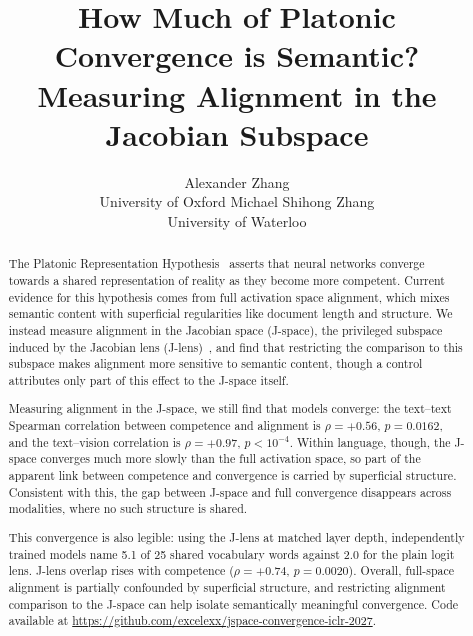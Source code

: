 \documentclass{article}
\title{How Much of Platonic Convergence is Semantic? Measuring Alignment in the Jacobian Subspace}
\author{%
  Alexander Zhang \\
  University of Oxford
  \And
  Michael Shihong Zhang \\
  University of Waterloo
}
\begin{document}
\raggedbottom

\maketitle

\begin{abstract}
  The Platonic Representation Hypothesis~\citep{huh2024platonic} asserts that neural networks converge towards a shared representation of reality as they become more competent. Current evidence for this hypothesis comes from full activation space alignment, which mixes semantic content with superficial regularities like document length and structure. We instead measure alignment in the Jacobian space (J-space), the privileged subspace induced by the Jacobian lens (J-lens)~\citep{gurnee2026verbalizable}, and find that restricting the comparison to this subspace makes alignment more sensitive to semantic content, though a control attributes only part of this effect to the J-space itself.
  
  Measuring alignment in the J-space, we still find that models converge: the text--text Spearman correlation between competence and alignment is $\rho = +0.56$, $p = 0.0162$, and the text--vision correlation is $\rho = +0.97$, $p < 10^{-4}$. Within language, though, the J-space converges much more slowly than the full activation space, so part of the apparent link between competence and convergence is carried by superficial structure. Consistent with this, the gap between J-space and full convergence disappears across modalities, where no such structure is shared.
  
  This convergence is also legible: using the J-lens at matched layer depth, independently trained models name 5.1 of 25 shared vocabulary words against 2.0 for the plain logit lens. J-lens overlap rises with competence ($\rho = +0.74$, $p = 0.0020$). Overall, full-space alignment is partially confounded by superficial structure, and restricting alignment comparison to the J-space can help isolate semantically meaningful convergence. Code available at \url{https://github.com/excelexx/jspace-convergence-iclr-2027}.
\end{abstract}
\end{document}

